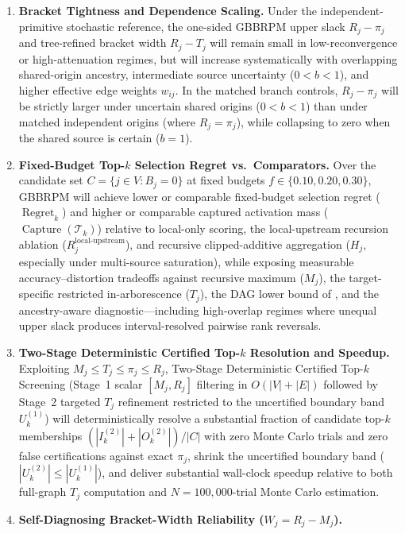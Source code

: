 \begin{enumerate}[label=\textbf{H\arabic*.},leftmargin=*]
\item \textbf{Bracket Tightness and Dependence Scaling.} Under the
independent-primitive stochastic reference, the one-sided GBBRPM upper slack
$R_j - \pi_j$ and tree-refined bracket width $R_j - T_j$ will remain small in
low-reconvergence or high-attenuation regimes, but will increase
systematically with overlapping shared-origin ancestry, intermediate source
uncertainty ($0 < b < 1$), and higher effective edge weights $w_{ij}$. In the
matched branch controls, $R_j - \pi_j$ will be strictly larger under uncertain
shared origins ($0 < b < 1$) than under matched independent origins (where
$R_j = \pi_j$), while collapsing to zero when the shared source is certain
($b = 1$).
\item \textbf{Fixed-Budget Top-$k$ Selection Regret vs.\ Comparators.} Over
the candidate set $C = \{j \in V : B_j = 0\}$ at fixed budgets
$f \in \{0.10, 0.20, 0.30\}$, GBBRPM will achieve lower or comparable
fixed-budget selection regret ($\operatorname{Regret}_k$) and higher or
comparable captured activation mass ($\operatorname{Capture}(\mathcal{T}_k)$)
relative to local-only scoring, the local-upstream recursion ablation
($R_j^{\mathrm{local\text{-}upstream}}$), and recursive clipped-additive
aggregation ($H_j$, especially under multi-source saturation), while exposing
measurable accuracy--distortion tradeoffs against recursive maximum ($M_j$),
the target-specific restricted in-arborescence ($T_j$), the DAG lower bound
of \citet{abbe2020}, and the ancestry-aware diagnostic---including
high-overlap regimes where unequal upper slack produces interval-resolved
pairwise rank reversals.
\item \textbf{Two-Stage Deterministic Certified Top-$k$ Resolution and
Speedup.} Exploiting $M_j \le T_j \le \pi_j \le R_j$, Two-Stage Deterministic
Certified Top-$k$ Screening (Stage~1 scalar $[M_j, R_j]$ filtering in
$O(|V|+|E|)$ followed by Stage~2 targeted $T_j$ refinement restricted to the
uncertified boundary band $U_k^{(1)}$) will deterministically resolve a
substantial fraction of candidate top-$k$ memberships
$(|I_k^{(2)}| + |O_k^{(2)}|)/|C|$ with zero Monte Carlo trials and zero false
certifications against exact $\pi_j$, shrink the uncertified boundary band
($|U_k^{(2)}| \le |U_k^{(1)}|$), and deliver substantial wall-clock speedup
relative to both full-graph $T_j$ computation and $N = 100{,}000$-trial Monte
Carlo estimation.
\item \textbf{Self-Diagnosing Bracket-Width Reliability ($W_j = R_j - M_j$).}

\end{enumerate}
